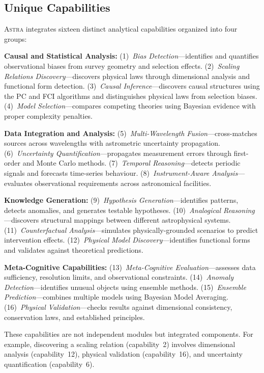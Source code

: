 \documentclass[usenatbib]{rasti}
\newcommand{\astra}{\textsc{Astra}\xspace}
\newcommand{\pc}{PC\xspace}
\newcommand{\fci}{FCI\xspace}
\begin{document}
\subsection{Unique Capabilities}
\label{sec:methods:capabilities}

\astra integrates sixteen distinct analytical capabilities organized into four groups:

\textbf{Causal and Statistical Analysis:}
(1)~\emph{Bias Detection}---identifies and quantifies observational biases from survey geometry and selection effects.
(2)~\emph{Scaling Relations Discovery}---discovers physical laws through dimensional analysis and functional form detection.
(3)~\emph{Causal Inference}---discovers causal structures using the \pc and \fci algorithms \citep{Spirtes2000,Zhang2008} and distinguishes physical laws from selection biases.
(4)~\emph{Model Selection}---compares competing theories using Bayesian evidence with proper complexity penalties.

\textbf{Data Integration and Analysis:}
(5)~\emph{Multi-Wavelength Fusion}---cross-matches sources across wavelengths with astrometric uncertainty propagation.
(6)~\emph{Uncertainty Quantification}---propagates measurement errors through first-order and Monte Carlo methods.
(7)~\emph{Temporal Reasoning}---detects periodic signals and forecasts time-series behaviour.
(8)~\emph{Instrument-Aware Analysis}---evaluates observational requirements across astronomical facilities.

\textbf{Knowledge Generation:}
(9)~\emph{Hypothesis Generation}---identifies patterns, detects anomalies, and generates testable hypotheses.
(10)~\emph{Analogical Reasoning}---discovers structural mappings between different astrophysical systems.
(11)~\emph{Counterfactual Analysis}---simulates physically-grounded scenarios to predict intervention effects.
(12)~\emph{Physical Model Discovery}---identifies functional forms and validates against theoretical predictions.

\textbf{Meta-Cognitive Capabilities:}
(13)~\emph{Meta-Cognitive Evaluation}---assesses data sufficiency, resolution limits, and observational constraints.
(14)~\emph{Anomaly Detection}---identifies unusual objects using ensemble methods.
(15)~\emph{Ensemble Prediction}---combines multiple models using Bayesian Model Averaging.
(16)~\emph{Physical Validation}---checks results against dimensional consistency, conservation laws, and established principles.

These capabilities are not independent modules but integrated components.
For example, discovering a scaling relation (capability~2) involves dimensional analysis (capability~12), physical validation (capability~16), and uncertainty quantification (capability~6).
\end{document}
